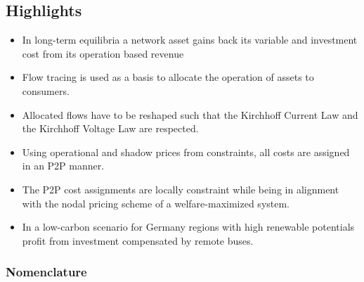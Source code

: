 \documentclass[11pt,twocolumn]{article}
\begin{document}
\subsection*{Highlights}
\begin{itemize}
    \item In long-term equilibria a network asset gains back its variable and investment cost from its operation based revenue
    \item Flow tracing is used as a basis to allocate the operation of assets to consumers. 
    \item Allocated flows have to be reshaped such that the Kirchhoff Current Law and the Kirchhoff Voltage Law are respected. 
    \item Using operational and shadow prices from constraints, all costs are assigned in an P2P manner.
    \item The P2P cost assignments are locally constraint while being in alignment with the nodal pricing scheme of a welfare-maximized system.    
    \item In a low-carbon scenario for Germany regions with high renewable potentials profit from investment compensated by remote buses.   
\end{itemize}


\subsubsection*{Nomenclature}
\end{document}
